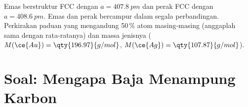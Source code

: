 \begin{exercise}[$\star\star\star$]\label{exo:b1:crystals-metals:12}
Emas berstruktur FCC dengan $a = \qty{407.8}{pm}$ dan perak FCC dengan
$a = \qty{408.6}{pm}$. Emas dan perak bercampur dalam segala perbandingan.
Perkirakan  paduan yang mengandung 50\,\% atom
masing-masing (anggaplah sama dengan rata-ratanya) dan massa jenisnya
($M(\ce{Au}) = \qty{196.97}{g/mol}$, $M(\ce{Ag}) = \qty{107.87}{g/mol}$).
\end{exercise}

\section{Soal: Mengapa Baja Menampung Karbon}

